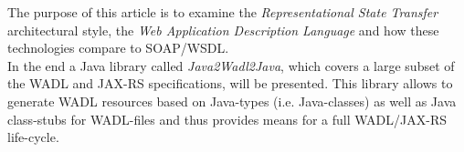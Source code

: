 The purpose of this article is to examine the \emph{Representational State Transfer} architectural style, the \emph{Web Application Description Language} and how these technologies compare to SOAP/WSDL.
\\
In the end a Java library called \emph{Java2Wadl2Java}, which covers a large subset of the WADL and JAX-RS specifications, will be presented. This library allows to generate WADL resources based on Java-types (i.e. Java-classes) as well as Java class-stubs for WADL-files and thus provides means for a full WADL/JAX-RS life-cycle.